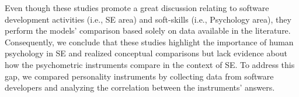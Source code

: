 Even though these studies promote a great discussion relating to software development activities (i.e., SE area) and soft-skills (i.e., Psychology area), they perform the models' comparison based solely on data available in the literature. Consequently, we conclude that these studies highlight the importance of human psychology in SE and realized conceptual comparisons but lack evidence about how the psychometric instruments compare in the context of SE. To address this gap, we compared personality instruments by collecting data from software developers and analyzing the correlation between the instruments' answers.